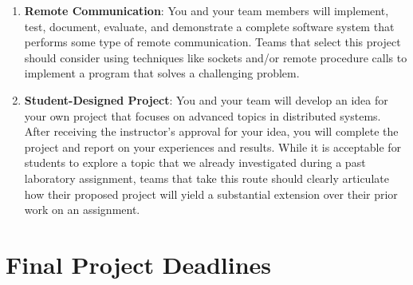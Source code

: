 \begin{enumerate}
  \item {\bf Remote Communication}: You and your team members will implement, test, document, evaluate, and
    demonstrate a complete software system that performs some type of remote communication.  Teams that select this
    project should consider using techniques like sockets and/or remote procedure calls to implement a program that solves
    a challenging problem.

  \item {\bf Student-Designed Project}: You and your team will develop an idea for your own project that focuses on
    advanced topics in distributed systems. After receiving the instructor's approval for your idea, you will complete
    the project and report on your experiences and results. While it is acceptable for students to explore a topic that
    we already investigated during a past laboratory assignment, teams that take this route should clearly articulate how
    their proposed project will yield a substantial extension over their prior work on an assignment.


\end{enumerate}

\vspace*{-.05in}

\section*{Final Project Deadlines}


